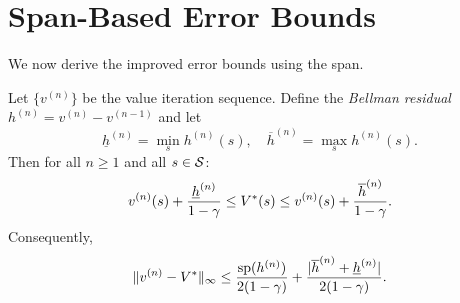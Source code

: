 \documentclass[11pt,a4paper]{article}
\begin{document}
\section{Span-Based Error Bounds}
\label{sec:span-bounds}

We now derive the improved error bounds using the span.

\begin{theorem}
\label{thm:span-aposteriori}
Let $\{v^{(n)}\}$ be the value iteration sequence. Define the
\emph{Bellman residual} $h^{(n)} = v^{(n)} - v^{(n-1)}$ and let
\[
    \underline{h}^{(n)} = \min_{s} h^{(n)}(s), \quad
    \overline{h}^{(n)} = \max_{s} h^{(n)}(s).
\]
Then for all $n \geq 1$ and all $s \in \mathcal{S}$:
\[
    v^{(n)}(s) + \frac{\underline{h}^{(n)}}{1 - \gamma}
    \leq V^*(s)
    \leq v^{(n)}(s) + \frac{\overline{h}^{(n)}}{1 - \gamma}.
\]
Consequently,
\[
    \|v^{(n)} - V^*\|_\infty
    \leq \frac{\mathrm{sp}(h^{(n)})}{2(1-\gamma)}
    + \frac{|\overline{h}^{(n)} + \underline{h}^{(n)}|}{2(1-\gamma)}.
\]
\end{theorem}
\end{document}
